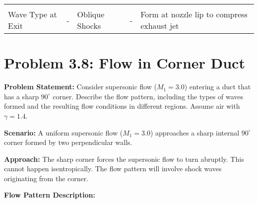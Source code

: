 \begin{longtable}[]{@{}lllll@{}}
\begin{minipage}[t]{0.06\columnwidth}
\strut
\end{minipage} & \begin{minipage}[t]{0.38\columnwidth}\raggedright
\strut
\end{minipage}\tabularnewline
\begin{minipage}[t]{0.23\columnwidth}\raggedright
Wave Type at Exit\strut
\end{minipage} & \begin{minipage}[t]{0.07\columnwidth}\raggedright
-\strut
\end{minipage} & \begin{minipage}[t]{0.12\columnwidth}\raggedright
Oblique Shocks\strut
\end{minipage} & \begin{minipage}[t]{0.06\columnwidth}\raggedright
-\strut
\end{minipage} & \begin{minipage}[t]{0.38\columnwidth}\raggedright
Form at nozzle lip to compress exhaust jet\strut
\end{minipage}\tabularnewline
\bottomrule
\end{longtable}

\hypertarget{problem-3.8-flow-in-corner-duct}{%
\section{Problem 3.8: Flow in Corner
Duct}\label{problem-3.8-flow-in-corner-duct}}

\textbf{Problem Statement:} Consider supersonic flow (\(M_1 = 3.0\))
entering a duct that has a sharp \(90^\circ\) corner. Describe the flow
pattern, including the types of waves formed and the resulting flow
conditions in different regions. Assume air with \(\gamma = 1.4\).

\textbf{Scenario:} A uniform supersonic flow (\(M_1=3.0\)) approaches a
sharp internal \(90^\circ\) corner formed by two perpendicular walls.

\textbf{Approach:} The sharp corner forces the supersonic flow to turn
abruptly. This cannot happen isentropically. The flow pattern will
involve shock waves originating from the corner.

\textbf{Flow Pattern Description:}

